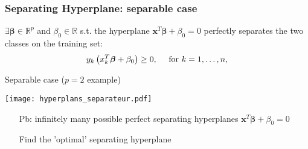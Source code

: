 \begin{frame}
  \frametitle{Separating Hyperplane: separable case}


  \medskip

  $\exists \boldsymbol{\beta}  \in \mathbb{R}^p$ and $\beta_0 \in \mathbb{R}$ s.t. the hyperplane
  $\boldsymbol{x}^T \boldsymbol{\beta} + \beta_0 = 0$
  perfectly separates
  the two classes on the training set:
  $$\begin{displaystyle}       y_k  \left(  x^T_k \boldsymbol{\beta} + \beta_0 \right) \ge 0, \quad \textrm{ for } k=1,\ldots,n,
  \end{displaystyle}$$

\begin{block}{Separable case ($p=2$ example)}
\begin{minipage}{.6\textwidth}
  \texttt{[image: hyperplans\_separateur.pdf]}
\end{minipage}
\begin{minipage}{.39\textwidth}
  \begin{itemize}
     \item[\alert{Pb:}] infinitely \alert{many} possible perfect \alert{separating hyperplanes} $\boldsymbol{x}^T\boldsymbol{\beta} + \beta_0=0$
     \item[\doigt] Find the 'optimal' separating hyperplane
  \end{itemize}
  \end{minipage}
\end{block}

\end{frame}


